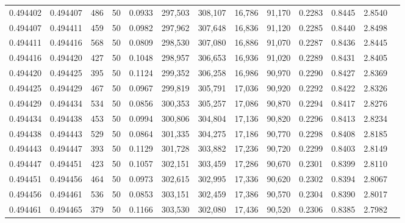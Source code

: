 \begin{tabular}{rrrrrrrrrrrrr}
0.494402 & 0.494407 &   486 &  50 &                                     0.0933 & 297,503 & 308,107 &  16,786 &  91,170 & 0.2283 & 0.8445 & 2.8540 \\
0.494407 & 0.494411 &   459 &  50 &                                     0.0982 & 297,962 & 307,648 &  16,836 &  91,120 & 0.2285 & 0.8440 & 2.8498 \\
0.494411 & 0.494416 &   568 &  50 &                                     0.0809 & 298,530 & 307,080 &  16,886 &  91,070 & 0.2287 & 0.8436 & 2.8445 \\
0.494416 & 0.494420 &   427 &  50 &                                     0.1048 & 298,957 & 306,653 &  16,936 &  91,020 & 0.2289 & 0.8431 & 2.8405 \\
0.494420 & 0.494425 &   395 &  50 &                                     0.1124 & 299,352 & 306,258 &  16,986 &  90,970 & 0.2290 & 0.8427 & 2.8369 \\
0.494425 & 0.494429 &   467 &  50 &                                     0.0967 & 299,819 & 305,791 &  17,036 &  90,920 & 0.2292 & 0.8422 & 2.8326 \\
0.494429 & 0.494434 &   534 &  50 &                                     0.0856 & 300,353 & 305,257 &  17,086 &  90,870 & 0.2294 & 0.8417 & 2.8276 \\
0.494434 & 0.494438 &   453 &  50 &                                     0.0994 & 300,806 & 304,804 &  17,136 &  90,820 & 0.2296 & 0.8413 & 2.8234 \\
0.494438 & 0.494443 &   529 &  50 &                                     0.0864 & 301,335 & 304,275 &  17,186 &  90,770 & 0.2298 & 0.8408 & 2.8185 \\
0.494443 & 0.494447 &   393 &  50 &                                     0.1129 & 301,728 & 303,882 &  17,236 &  90,720 & 0.2299 & 0.8403 & 2.8149 \\
0.494447 & 0.494451 &   423 &  50 &                                     0.1057 & 302,151 & 303,459 &  17,286 &  90,670 & 0.2301 & 0.8399 & 2.8110 \\
0.494451 & 0.494456 &   464 &  50 &                                     0.0973 & 302,615 & 302,995 &  17,336 &  90,620 & 0.2302 & 0.8394 & 2.8067 \\
0.494456 & 0.494461 &   536 &  50 &                                     0.0853 & 303,151 & 302,459 &  17,386 &  90,570 & 0.2304 & 0.8390 & 2.8017 \\
0.494461 & 0.494465 &   379 &  50 &                                     0.1166 & 303,530 & 302,080 &  17,436 &  90,520 & 0.2306 & 0.8385 & 2.7982 \\

\end{tabular}
